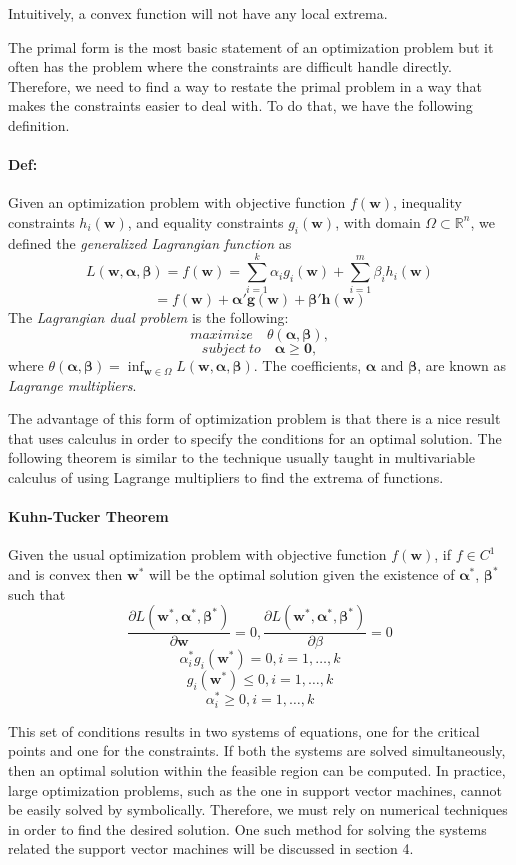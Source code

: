 \documentclass{article}
\newcommand{\bw}{\mathbf{w}}
\newcommand{\balpha}{\bm{\alpha}}
\newcommand{\bbeta}{\bm{\beta}}
\begin{document}
Intuitively, a convex function will not have any local extrema.

The primal form is the most basic statement of an optimization problem but it often has the problem where the constraints are difficult handle directly. Therefore, we need to find a way to restate the primal problem in a way that makes the constraints easier to deal with. To do that, we have the following definition.
\paragraph{Def:} Given an optimization problem with objective function $f(\bw)$, inequality constraints $h_i(\bw)$, and equality constraints $g_i(\bw)$, with domain $\Omega \subset \mathbb{R}^n$, we defined the \textit{generalized Lagrangian function} as 
$$ L(\bw, \balpha, \bbeta) = f(\bw) = \sum_{i=1}^k \alpha_i g_i(\bw)+ \sum_{i=1}^m \beta_i h_i(\bw)$$
$$ = f(\bw) + \balpha' \mathbf{g}(\bw)+ \mathbf{\beta}' \mathbf{h}(\bw)$$
The \textit{Lagrangian dual problem} is the following:
$$ maximize \quad \theta(\balpha, \bbeta),$$
$$ subject\ to \quad \balpha \geq \mathbf{0},$$
where $\theta(\balpha, \bbeta) = \inf_{\bw \in \Omega} L(\bw, \balpha, \bbeta)$. The coefficients, $\balpha$ and $\bbeta$, are known as \textit{Lagrange multipliers}.

The advantage of this form of optimization problem is that there is a nice result that uses calculus in order to specify the conditions for an optimal solution. The following theorem is similar to the technique usually taught in multivariable calculus of using Lagrange multipliers to find the extrema of functions. 

\paragraph{Kuhn-Tucker Theorem} Given the usual optimization problem with objective function $f(\bw)$, if $f \in C^1$ and is convex then $\bw^*$ will be the optimal solution given the existence of $\balpha^*$, $\bbeta^*$ such that
$$ \frac{\partial L(\bw^*, \balpha^*, \bbeta^*)}{\partial \bw} = 0, \frac{\partial L(\bw^*, \balpha^*, \bbeta^*)}{\partial \beta} = 0$$
$$ \alpha_i^*g_i(\bw^*) = 0, i = 1, \dots, k$$
$$ g_i(\bw^*) \leq 0, i = 1, \dots, k$$
$$ \alpha_i^* \geq 0, i = 1, \dots, k$$

This set of conditions results in two systems of equations, one for the critical points and one for the constraints. If both the systems are solved simultaneously, then an optimal solution within the feasible region can be computed. In practice, large optimization problems, such as the one in support vector machines, cannot be easily solved by symbolically. Therefore, we must rely on numerical techniques in order to find the desired solution. One such method for solving the systems related the support vector machines will be discussed in section 4.
\end{document}
